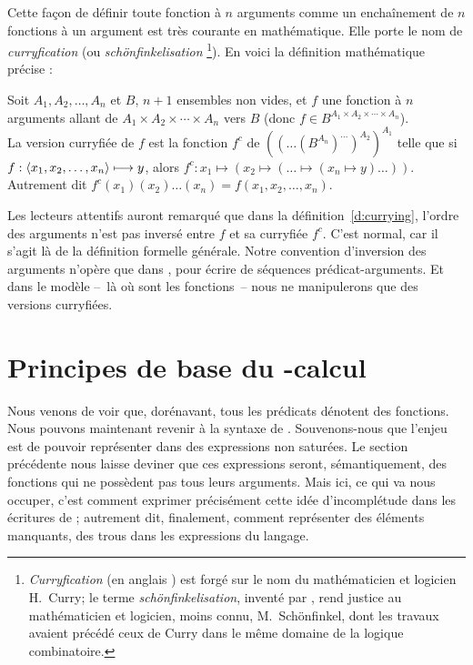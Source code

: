 Cette façon de définir toute fonction à $n$ arguments comme un
enchaînement de $n$ fonctions à un argument est très courante en
mathématique.  Elle porte le nom de 
\emph{curryfication} (ou
\emph{schönfinkelisation}%
\footnote{\emph{Curryfication} (en anglais ) est forgé
sur le nom du mathématicien et logicien H.\ Curry; le terme
\emph{schönfinkelisation}, inventé par \citet{HeimKratzer:97}, rend justice au mathématicien et logicien, moins connu,
M.\ Schönfinkel, dont les travaux avaient précédé ceux de Curry dans
le même domaine de la logique combinatoire.}). En voici la définition
mathématique précise :

\begin{defi}[Curryfication] \label{d:currying}
Soit $A_1, A_2,\dotsc, A_n$ et $B$, $n+1$ ensembles non vides, et $f$
une fonction à $n$ arguments allant de $A_1 \times A_2\times \cdots \times A_n$
vers $B$ (donc \(f\in B^{A_1 \times A_2\times \cdots \times A_n}\)).\\
La version curryfiée de $f$ est la fonction $f^c$ de
\(((\dotsc(B^{A_n})^{\dotsc})^{A_2})^{A_1}\) telle que si $f :
\langle x_1,x_2,\dotsc,x_n \rangle \longmapsto y$, alors 
$f^c : x_1 \longmapsto (x_2 \longmapsto (\dotsc \longmapsto (x_n
\longmapsto y)\dotsc))$.
\\Autrement dit \(f^c(x_1)(x_2)\dotsc(x_n) =
f(x_1,x_2,\dotsc,x_n)\). 
\end{defi}


Les lecteurs attentifs auront remarqué que dans  la
définition~\ref{d:currying}, l'ordre des arguments n'est pas inversé
entre $f$ et sa curryfiée $f^c$.
C'est normal, car il s'agit là de  la définition formelle générale. 
Notre convention d'inversion des arguments n'opère que dans {\LO},
pour écrire de séquences prédicat-arguments. Et dans le modèle --~là où
sont les fonctions~-- nous ne manipulerons que des versions
curryfiées. 



\section{Principes de base du \ulambda-calcul}
\label{s:lambda}


Nous venons de voir que, dorénavant, tous les prédicats dénotent des
fonctions. Nous pouvons maintenant revenir à la syntaxe de
{\LO}. Souvenons-nous que l'enjeu est de pouvoir représenter dans
{\LO} des expressions non saturées.  Le section précédente nous laisse
deviner que ces expressions seront, sémantiquement, des fonctions qui
ne possèdent pas tous leurs arguments.  Mais ici, ce qui va nous
occuper, c'est comment exprimer précisément cette idée d'incomplétude
dans les écritures de {\LO} ; autrement dit, finalement, comment
représenter des éléments manquants, des trous dans les expressions du
\mbox{langage}.   

